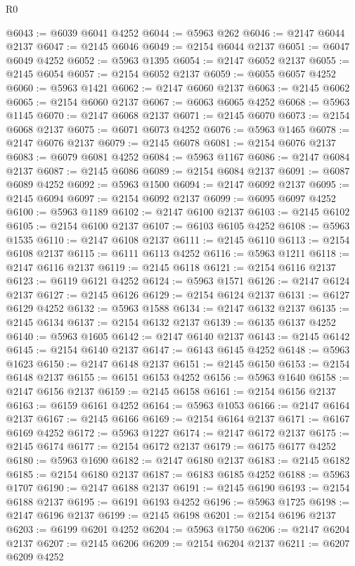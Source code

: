 \begin{lexlean}{R0}
\begin{coremodule}
@6043 := @6039 @6041 @4252
@6044 := @5963 @262
@6046 := @2147 @6044 @2137
@6047 := @2145 @6046
@6049 := @2154 @6044 @2137
@6051 := @6047 @6049 @4252
@6052 := @5963 @1395
@6054 := @2147 @6052 @2137
@6055 := @2145 @6054
@6057 := @2154 @6052 @2137
@6059 := @6055 @6057 @4252
@6060 := @5963 @1421
@6062 := @2147 @6060 @2137
@6063 := @2145 @6062
@6065 := @2154 @6060 @2137
@6067 := @6063 @6065 @4252
@6068 := @5963 @1145
@6070 := @2147 @6068 @2137
@6071 := @2145 @6070
@6073 := @2154 @6068 @2137
@6075 := @6071 @6073 @4252
@6076 := @5963 @1465
@6078 := @2147 @6076 @2137
@6079 := @2145 @6078
@6081 := @2154 @6076 @2137
@6083 := @6079 @6081 @4252
@6084 := @5963 @1167
@6086 := @2147 @6084 @2137
@6087 := @2145 @6086
@6089 := @2154 @6084 @2137
@6091 := @6087 @6089 @4252
@6092 := @5963 @1500
@6094 := @2147 @6092 @2137
@6095 := @2145 @6094
@6097 := @2154 @6092 @2137
@6099 := @6095 @6097 @4252
@6100 := @5963 @1189
@6102 := @2147 @6100 @2137
@6103 := @2145 @6102
@6105 := @2154 @6100 @2137
@6107 := @6103 @6105 @4252
@6108 := @5963 @1535
@6110 := @2147 @6108 @2137
@6111 := @2145 @6110
@6113 := @2154 @6108 @2137
@6115 := @6111 @6113 @4252
@6116 := @5963 @1211
@6118 := @2147 @6116 @2137
@6119 := @2145 @6118
@6121 := @2154 @6116 @2137
@6123 := @6119 @6121 @4252
@6124 := @5963 @1571
@6126 := @2147 @6124 @2137
@6127 := @2145 @6126
@6129 := @2154 @6124 @2137
@6131 := @6127 @6129 @4252
@6132 := @5963 @1588
@6134 := @2147 @6132 @2137
@6135 := @2145 @6134
@6137 := @2154 @6132 @2137
@6139 := @6135 @6137 @4252
@6140 := @5963 @1605
@6142 := @2147 @6140 @2137
@6143 := @2145 @6142
@6145 := @2154 @6140 @2137
@6147 := @6143 @6145 @4252
@6148 := @5963 @1623
@6150 := @2147 @6148 @2137
@6151 := @2145 @6150
@6153 := @2154 @6148 @2137
@6155 := @6151 @6153 @4252
@6156 := @5963 @1640
@6158 := @2147 @6156 @2137
@6159 := @2145 @6158
@6161 := @2154 @6156 @2137
@6163 := @6159 @6161 @4252
@6164 := @5963 @1053
@6166 := @2147 @6164 @2137
@6167 := @2145 @6166
@6169 := @2154 @6164 @2137
@6171 := @6167 @6169 @4252
@6172 := @5963 @1227
@6174 := @2147 @6172 @2137
@6175 := @2145 @6174
@6177 := @2154 @6172 @2137
@6179 := @6175 @6177 @4252
@6180 := @5963 @1690
@6182 := @2147 @6180 @2137
@6183 := @2145 @6182
@6185 := @2154 @6180 @2137
@6187 := @6183 @6185 @4252
@6188 := @5963 @1707
@6190 := @2147 @6188 @2137
@6191 := @2145 @6190
@6193 := @2154 @6188 @2137
@6195 := @6191 @6193 @4252
@6196 := @5963 @1725
@6198 := @2147 @6196 @2137
@6199 := @2145 @6198
@6201 := @2154 @6196 @2137
@6203 := @6199 @6201 @4252
@6204 := @5963 @1750
@6206 := @2147 @6204 @2137
@6207 := @2145 @6206
@6209 := @2154 @6204 @2137
@6211 := @6207 @6209 @4252

\end{coremodule}
\end{lexlean}
